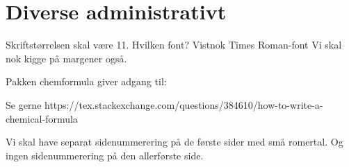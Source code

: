 \documentclass[a5paper,20pt]{book}
\begin{document}



\tableofcontents











\chapter{Diverse administrativt}
Skriftstørrelsen skal være 11.
Hvilken font? Vistnok Times Roman-font
Vi skal nok kigge på margener også.

Pakken chemformula giver adgang til:




Se gerne https://tex.stackexchange.com/questions/384610/how-to-write-a-chemical-formula

Vi skal have separat sidenummerering på de første sider med små romertal. Og ingen sidenummerering på den allerførste side.


\end{document}
